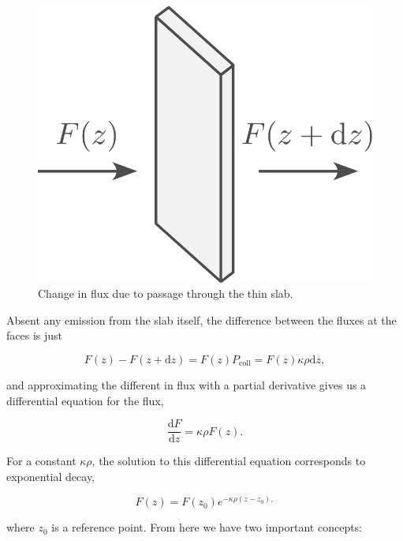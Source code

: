 \documentclass[twocolumn]{article}
\begin{document}
\begin{figure}
\centering
\includegraphics{../assets/5_radiative/flux.pdf}
\caption{Change in flux due to passage through the thin slab.}
\end{figure}

Absent any emission from the slab itself, the difference between the
fluxes at the faces is just

\[F(z)-F(z+\mathrm{d}z)=F(z)P_\mathrm{coll}=F(z)\kappa\rho\mathrm{d}z,\]

and approximating the different in flux with a partial derivative gives
us a differential equation for the flux,

\[\frac{\mathrm{d}F}{\mathrm{d}z} = \kappa\rho F(z).\]

For a constant \(\kappa\rho\), the solution to this differential
equation corresponds to exponential decay,

\[F(z)=F(z_0)e^{-\kappa\rho(z-z_0),}\]

where \(z_0\) is a reference point. From here we have two important
concepts:
\end{document}
